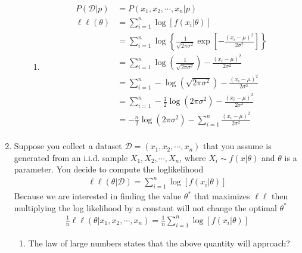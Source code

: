 \documentclass[krantz1,ChapterTOCs]{krantz}
\begin{document}
\begin{enumerate}
\begin{enumerate}
        \begin{enumerate}
            \item {\color{red} 
                \begin{align*}
                    P(\mathcal{D} | p) &= P(x_{1},x_{2},\cdots,x_{n} | p)\\
                    \ell \ell (\theta) &= \sum_{i=1}^{n} \log\left[ f(x_{i} | \theta) \right] \\
                    &= \sum_{i=1}^{n} \log\left\{ \frac{1}{\sqrt{2 \pi \sigma^{2}}} \exp\left[ -\frac{(x_{i} - \mu)^{2}}{2\sigma^{2}} \right]  \right\} \\ 
                    &= \sum_{i=1}^{n} \log\left( \frac{1}{\sqrt{2 \pi \sigma^{2}}} \right) - \frac{(x_{i} - \mu)^{2}}{2 \sigma^{2}} \\ 
                    &= \sum_{i=1}^{n} -\log\left( \sqrt{2 \pi \sigma^{2}} \right) - \frac{(x_{i} - \mu)^{2}}{2 \sigma^{2}} \\ 
                    &= \sum_{i=1}^{n} -\frac{1}{2}\log\left( 2 \pi \sigma^{2} \right) - \frac{(x_{i} - \mu)^{2}}{2 \sigma^{2}} \\ 
                    &=  -\frac{n}{2}\log\left( 2 \pi \sigma^{2} \right) - \sum_{i=1}^{n} \frac{(x_{i} - \mu)^{2}}{2 \sigma^{2}} \\ 
                \end{align*}
            }
        \end{enumerate}
        
    \end{enumerate}
    
    \item Suppose you collect a dataset $\mathcal{D} = (x_{1},x_{2},\cdots,x_{n})$ that you assume is generated from an i.i.d. sample $X_{1}, X_{2},\cdots, X_{n}$, where $X_{i} \sim f(x | \theta)$ and $\theta$ is a parameter.
    You decide to compute the loglikelihood
    \begin{align}
        \ell \ell (\theta | \mathcal{D}) = \sum_{i=1}^{n} \log \left [ f(x_{i} | \theta) \right]
    \end{align}
    Because we are interested in finding the value $\theta^{*}$ that maximizes $\mathcal{\ell \ell}$ then multiplying the log likelihood by a constant will not change the optimal $\theta^{*}$
    \begin{align}
        \frac{1}{n} \ell \ell (\theta | x_{1}, x_{2}, \cdots, x_{n}) = \frac{1}{n} \sum_{i=1}^{n} \log \left [ f(x_{i} | \theta) \right]
    \end{align}
    \begin{enumerate}
        \item The law of large numbers states that the above quantity will approach?
        

\end{enumerate}
\end{enumerate}
\end{document}
